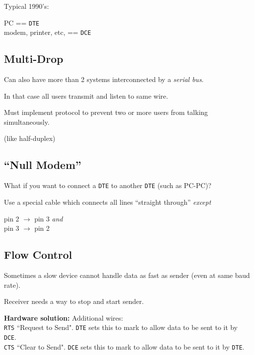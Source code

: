 Typical 1990's:

PC == {\tt DTE } \\
modem, printer, etc, == {\tt DCE}


\subsection{Multi-Drop}

Can also have more than 2 systems interconnected
by a {\it serial bus}.

In that case all users transmit and listen to
same wire.

Must implement protocol to prevent two or more
users from talking simultaneously.

(like half-duplex)

\subsection{``Null Modem''}

What if you want to connect a {\tt DTE} to
another {\tt DTE} (such as PC-PC)?

Use a special cable which connects all lines
``straight through'' {\it except}

pin 2 $\to$ pin 3 {\it and} \\
pin 3 $\to$ pin 2


\subsection{Flow Control}

Sometimes a slow device cannot handle data as
fast as sender (even at same baud rate).

Receiver needs a way to stop and start sender.

{\bf Hardware solution:} Additional wires:\\
{\tt RTS} ``Request to Send".  {\tt DTE}
sets this to mark to allow data to be sent to
it by {\tt DCE}. \\
{\tt CTS} ``Clear to Send". {\tt DCE} sets this
to mark to allow data to be sent to it by {\tt DTE}.

